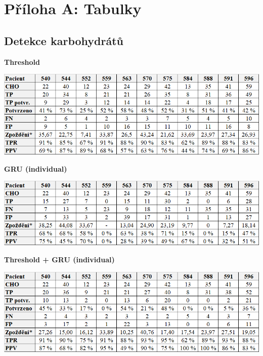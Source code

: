 \chapter*{Příloha A: Tabulky}

\section*{Detekce karbohydrátů}

\begin{table}[H]
\caption{\textbf{Threshold}}
\vspace*{1mm}
\label{tab:vys:th}
\centering
\includegraphics[width=1\textwidth]{img/vysledky/cho/1_th.png}
\end{table}

\begin{table}[H]
\caption{\textbf{GRU (individual)}}
\label{tab:vys:rnn_i}
\centering
\includegraphics[width=1\textwidth]{img/vysledky/cho/2_rnn_i.png}
\end{table}

\begin{table}[H]
\caption{\textbf{Threshold + GRU (individual)}}
\label{tab:vys:thrnn_i}
\centering
\includegraphics[width=1\textwidth]{img/vysledky/cho/3_thrnn_i.png}
\end{table}

